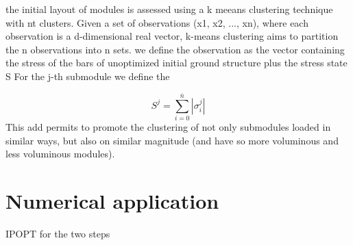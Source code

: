 the initial layout of modules is assessed using a k meeans clustering technique with nt clusters. Given a set of observations (x1, x2, ..., xn), where each observation is a d-dimensional real vector, k-means clustering aims to partition the n observations into n sets. we define the observation as the vector containing the stress of the bars of unoptimized initial ground structure plus the stress state S For the j-th submodule we define the 

\begin{equation}
    S^j=\sum_{i=0}^{\bar{n}}|\sigma^j_i|
\end{equation}
This add permits to promote the clustering of not only submodules loaded in similar ways, but also on similar magnitude (and have so more voluminous and less voluminous modules).

\section{Numerical application}
IPOPT for the two steps

